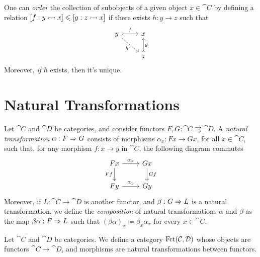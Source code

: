 \begin{example}
\label{exp:order-subobject}
One can \emph{order} the collection of subobjects of a given object \(x \in \cat
C\) by defining a relation \([f: y \rightarrowtail x] \leqslant [g: z \rightarrowtail x]\) if there
exists \(h: y \to z\) such that
\[
  \begin{tikzcd}
    y \ar[r, tail, "f"] \ar[rd, dashed, swap, "h"] &x \\
    &z \ar[u, tail, swap, "g"]
  \end{tikzcd}
\]
Moreover, \emph{if} \(h\) exists, then it's unique.
\end{example}

\begin{definition}
\label{def:comma-category}
\end{definition}

\section{Natural Transformations}

\begin{definition}
\label{def:natural-transformation}
Let \(\cat C\) and \(\cat D\) be categories, and consider functors \(F, G:
\cat C \rightrightarrows \cat D\). A \emph{natural transformation} \(\alpha: F
\Rightarrow G\) consists of morphisms \(\alpha_x: F x \to G x\), for all \(x \in \cat
C\), such that, for any morphism \(f: x \to y\) in \(\cat C\), the following
diagram commutes
\[
  \begin{tikzcd}
    F x \ar[r, "\alpha_x"] \ar[d, swap, "F f"]
    &G x \ar[d, "G f"] \\
    F y \ar[r, "\alpha_y"] &Gy
  \end{tikzcd}
\]
Moreover, if \(L: \cat C \to \cat D\) is another functor, and \(\beta: G \Rightarrow
L\) is a natural transformation, we define the \emph{composition} of natural
transformations \(\alpha\) and \(\beta\) as the map \(\beta \alpha: F \Rightarrow L\)
such that \((\beta \alpha)_x \coloneq \beta_x \alpha_x\) for every \(x \in \cat
C\).
\end{definition}

\begin{definition}
\label{def:functor-category}
Let \(\cat C\) and \(\cat D\) be categories. We define a category \(\operatorname{Fct}(\mathcal C,
\mathcal D)\) whose objects are functors \(\cat C \to \cat D\), and morphisms are
natural transformations between functors.
\end{definition}

